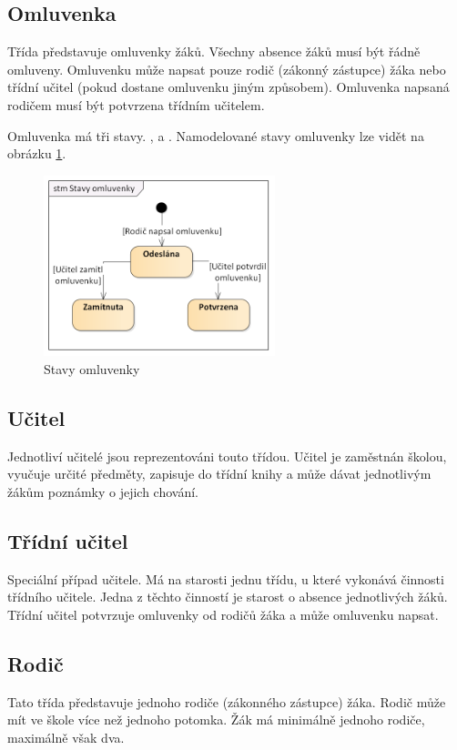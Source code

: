 \subsection{Omluvenka}
Třída představuje omluvenky žáků. Všechny absence žáků musí být řádně omluveny. Omluvenku může napsat pouze rodič (zákonný zástupce) žáka nebo třídní učitel (pokud dostane omluvenku jiným způsobem). Omluvenka napsaná rodičem musí být potvrzena třídním učitelem.

Omluvenka má tři stavy. ,  a . Namodelované stavy omluvenky lze vidět na obrázku \ref{stavy_omluvenky}.
\begin{figure}[h]
	\centering
	\includegraphics[width=0.6\textwidth]{images/Stavy_omluvenky.png}
	\caption{Stavy omluvenky}
	\label{stavy_omluvenky}
\end{figure}

\subsection{Učitel}
Jednotliví učitelé jsou reprezentováni touto třídou. Učitel je zaměstnán školou, vyučuje určité předměty, zapisuje do třídní knihy a může dávat jednotlivým žákům poznámky o jejich chování.
\subsection{Třídní učitel}
Speciální případ učitele. Má na starosti jednu třídu, u které vykonává činnosti třídního učitele. Jedna z těchto činností je starost o absence jednotlivých žáků. Třídní učitel potvrzuje omluvenky od rodičů žáka a může omluvenku napsat.
\subsection{Rodič}
Tato třída představuje jednoho rodiče (zákonného zástupce) žáka. Rodič může mít ve škole více než jednoho potomka. Žák má minimálně jednoho rodiče, maximálně však dva.
